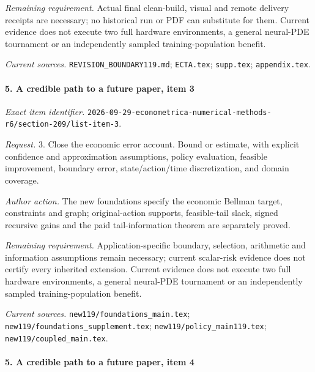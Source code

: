 \par\emph{Remaining requirement.} Actual final clean-build, visual and remote delivery receipts are necessary; no historical run or PDF can substitute for them. Current evidence does not execute two full hardware environments, a general neural-PDE tournament or an independently sampled training-population benefit.

\par\emph{Current sources.} \nolinkurl{REVISION_BOUNDARY119.md}; \nolinkurl{ECTA.tex}; \nolinkurl{supp.tex}; \nolinkurl{appendix.tex}.

\paragraph{5. A credible path to a future paper, item 3}

\emph{Exact item identifier.} \nolinkurl{2026-09-29-econometrica-numerical-methods-r6/section-209/list-item-3}.

\par\emph{Request.} 3. Close the economic error account. Bound or estimate, with explicit confidence and approximation assumptions, policy evaluation, feasible improvement, boundary error, state/\allowbreak{}action/\allowbreak{}time discretization, and domain coverage.

\par\emph{Author action.} The new foundations specify the economic Bellman target, constraints and graph; original-action supports, feasible-tail slack, signed recursive gains and the paid tail-information theorem are separately proved.

\par\emph{Remaining requirement.} Application-specific boundary, selection, arithmetic and information assumptions remain necessary; current scalar-risk evidence does not certify every inherited extension. Current evidence does not execute two full hardware environments, a general neural-PDE tournament or an independently sampled training-population benefit.

\par\emph{Current sources.} \nolinkurl{new119/foundations_main.tex}; \nolinkurl{new119/foundations_supplement.tex}; \nolinkurl{new119/policy_main119.tex}; \nolinkurl{new119/coupled_main.tex}.

\paragraph{5. A credible path to a future paper, item 4}

